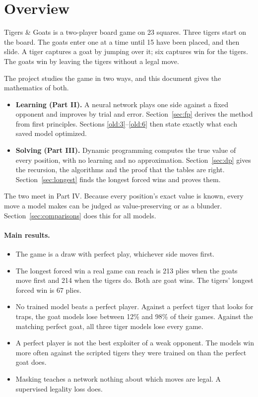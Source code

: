 \section{Overview}\label{sec:intro}

Tigers \& Goats is a two-player board game on 23 squares. Three tigers start on the board. The goats enter
one at a time until 15 have been placed, and then slide. A tiger captures a goat by jumping over it; six
captures win for the tigers. The goats win by leaving the tigers without a legal move.

The project studies the game in two ways, and this document gives the mathematics of both.

\begin{itemize}
\item \textbf{Learning (Part II).} A neural network plays one side against a fixed opponent and improves by
  trial and error. Section~\ref{sec:fp} derives the method from first principles. Sections
  \ref{old:3}--\ref{old:6} then state exactly what each saved model optimized.
\item \textbf{Solving (Part III).} Dynamic programming computes the true value of every position, with no
  learning and no approximation. Section~\ref{sec:dp} gives the recursion, the algorithms and the proof that
  the tables are right. Section~\ref{sec:longest} finds the longest forced wins and proves them.
\end{itemize}

The two meet in Part IV. Because every position's exact value is known, every move a model makes can be
judged as value-preserving or as a blunder. Section~\ref{sec:comparisons} does this for all models.

\paragraph{Main results.}
\begin{itemize}
\item The game is a draw with perfect play, whichever side moves first.
\item The longest forced win a real game can reach is 213 plies when the goats move first and 214 when the
  tigers do. Both are goat wins. The tigers' longest forced win is 67 plies.
\item No trained model beats a perfect player. Against a perfect tiger that looks for traps, the goat
  models lose between 12\% and 98\% of their games. Against the matching perfect goat, all three tiger
  models lose every game.
\item A perfect player is not the best exploiter of a weak opponent. The models win more often against the
  scripted tigers they were trained on than the perfect goat does.
\item Masking teaches a network nothing about which moves are legal. A supervised legality loss does.
\end{itemize}

